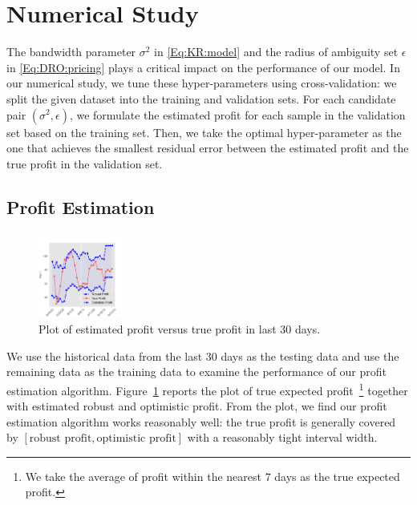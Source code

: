 \documentclass[competition,nonblindrev, 12pt]{informs3-competition}
\theoremstyle{TH}%
\theoremstyle{TH}%
\begin{document}
\section{Numerical Study}

The bandwidth parameter $\sigma^2$ in \eqref{Eq:KR:model} and the radius of ambiguity set $\epsilon$ in \eqref{Eq:DRO:pricing} plays a critical impact on the performance of our model.
In our numerical study, we tune these hyper-parameters using cross-validation: we split the given dataset into the training and validation sets. For each candidate pair $(\sigma^2,\epsilon)$, we formulate the estimated profit for each sample in the validation set based on the training set.
Then, we take the optimal hyper-parameter as the one that achieves the smallest residual error between the estimated profit and the true profit in the validation set. 
\subsection{Profit Estimation}
\begin{figure}
\vspace{-6em}
\centering
\includegraphics[width=0.25\textwidth]{Profit_estimator.pdf}
\vspace{-2em}
 \caption{Plot of estimated profit versus true profit in last 30 days.}
 \vspace{-2em}
\label{fig:profit:estimate}
\end{figure}
We use the historical data from the last $30$ days as the testing data and use the remaining data as the training data to examine the performance of our profit estimation algorithm.
Figure~\ref{fig:profit:estimate} reports the plot of true expected profit~\footnote{
We take the average of profit within the nearest $7$ days as the true expected profit.
} together with estimated robust and optimistic profit.
From the plot, we find our profit estimation algorithm works reasonably well: the true profit is generally covered by $[\text{robust profit}, \text{optimistic profit}]$ with a reasonably tight interval width.
\end{document}
